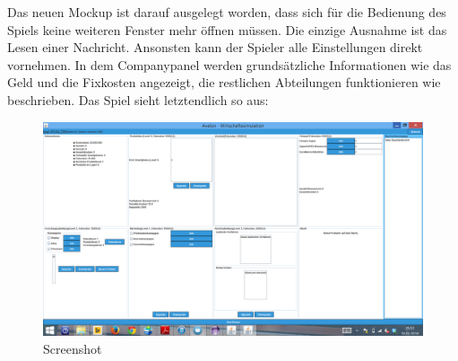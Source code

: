 Das neuen Mockup ist darauf ausgelegt worden, dass sich für die Bedienung des Spiels keine weiteren Fenster mehr öffnen müssen. Die einzige Ausnahme ist das Lesen einer Nachricht. Ansonsten kann der Spieler alle Einstellungen direkt vornehmen. In dem Companypanel werden grundsätzliche Informationen wie das Geld und die Fixkosten angezeigt, die restlichen Abteilungen funktionieren wie beschrieben.
Das Spiel sieht letztendlich so aus:

\begin{figure}
\centering
\includegraphics[width=0.7\linewidth]{../images/mockup3}
\caption{Screenshot}
\label{fig:mockup3}
\end{figure}









